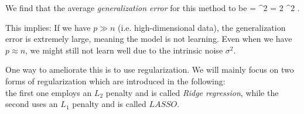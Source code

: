 We find that the average \emph{generalization error} for this method to be
\be 
{} = \sigma^2 = 2 \sigma^2 .
\ee 
\begin{mybox}{}
	This implies: If we have $p\gg n$ (i.e. high-dimensional data), the generalization error is extremely large, meaning the model is not learning. Even when we have $p\approx n$, we might still not learn well due to the intrinsic noise $\sigma^2$.
\end{mybox}
One way to ameliorate this is to use regularization. We will mainly focus on two forms of regularization which are introduced in the following:\\
the first one employs an $L_2$ penalty and is called \emph{Ridge regression}, while the second uses an $L_1$ penalty and is called $LASSO$.
